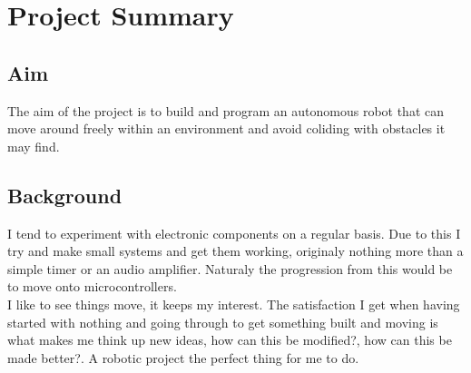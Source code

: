 \documentclass[11pt,fleqn,twoside]{article}
\begin{document}

\mmp

\setcounter{tocdepth}{3} %
\tableofcontents

\newpage

\section{Project Summary}
\subsection{Aim}
The aim of the project is to build and program an autonomous robot that can move around freely within an environment and avoid coliding with obstacles it may find.
\subsection{Background}
I tend to experiment with electronic components on a regular basis.  Due to this I try and make small systems and get them working, originaly nothing more than a simple timer or an audio amplifier.  Naturaly the progression from this would be to move onto microcontrollers.
\\I like to see things move, it keeps my interest.  The satisfaction I get when having started with nothing and going through to get something built and moving is what makes me think up new ideas, how can this be modified?, how can this be made better?.  A robotic project the perfect thing for me to do.
\end{document}
